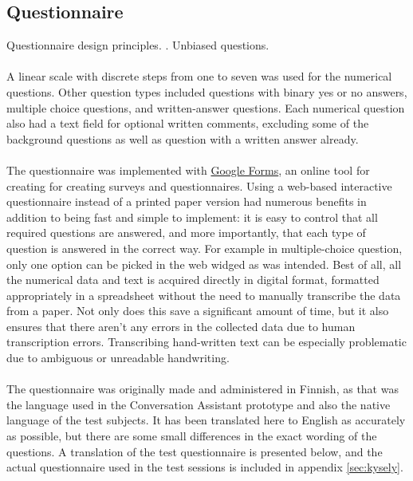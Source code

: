 \documentclass[english, 12pt, a4paper, pdftex, elec, utf8]{aaltothesis}
\begin{document}
\subsection{Questionnaire} \label{sec:quest}

Questionnaire design principles. \cite{dumas1999}. Unbiased questions. \\\\
A linear scale with discrete steps from one to seven was used for the numerical questions. Other question types included questions with binary yes or no answers, multiple choice questions, and written-answer questions. Each numerical question also had a text field for optional written comments, excluding some of the background questions as well as question with a written answer already. \\\\
The questionnaire was implemented with \href{https://www.google.com/forms/about/}{Google Forms}, an online tool for creating for creating surveys and questionnaires. Using a web-based interactive questionnaire instead of a printed paper version had numerous benefits in addition to being fast and simple to implement: it is easy to control that all required questions are answered, and more importantly, that each type of question is answered in the correct way. For example in multiple-choice question, only one option can be picked in the web widged as was intended. Best of all, all the numerical data and text is acquired directly in digital format, formatted appropriately in a spreadsheet without the need to manually transcribe the data from a paper. Not only does this save a significant amount of time, but it also ensures that there aren't any errors in the collected data due to human transcription errors. Transcribing hand-written text can be especially problematic due to ambiguous or unreadable handwriting. \\\\
The questionnaire was originally made and administered in Finnish, as that was the language used in the Conversation Assistant prototype and also the native language of the test subjects. It has been translated here to English as accurately as possible, but there are some small differences in the exact wording of the questions. A translation of the test questionnaire is presented below, and the actual questionnaire used in the test sessions is included in appendix \ref{sec:kysely}. \vspace{0.15cm}  \\
\end{document}
